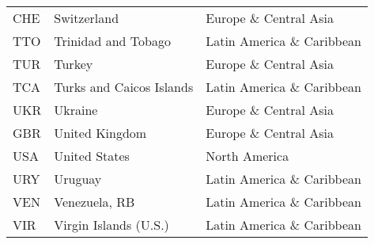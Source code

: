 \documentclass[../main.tex]{subfiles}
\begin{document}
\begin{center}
\begin{longtable}[H]{lll}
CHE       & Switzerland                    & Europe \& Central Asia     \\
TTO       & Trinidad and Tobago            & Latin America \& Caribbean \\
TUR       & Turkey                         & Europe \& Central Asia     \\
TCA       & Turks and Caicos Islands       & Latin America \& Caribbean \\
UKR       & Ukraine                        & Europe \& Central Asia     \\
GBR       & United Kingdom                 & Europe \& Central Asia     \\
USA       & United States                  & North America              \\
URY       & Uruguay                        & Latin America \& Caribbean \\
VEN       & Venezuela, RB                  & Latin America \& Caribbean \\
VIR       & Virgin Islands (U.S.)          & Latin America \& Caribbean \\
\end{longtable}
\end{center}
\end{document}
